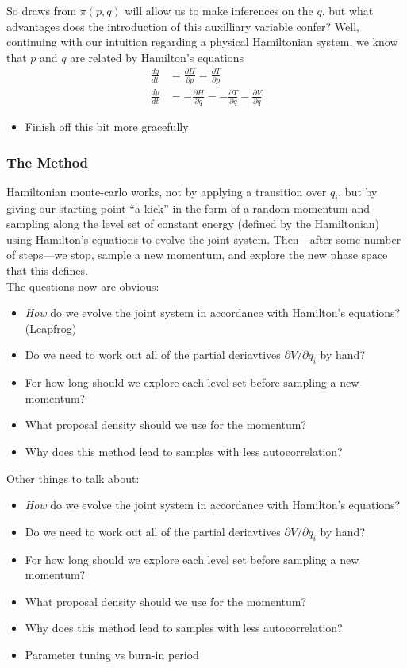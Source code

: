\documentclass{report}
\begin{document}
So draws from $\pi(p, q)$ will allow us to make inferences on the $q$, but what advantages does the introduction of this auxilliary variable confer? Well, continuing with our intuition regarding a physical Hamiltonian system, we know that $p$ and $q$ are related by Hamilton's equations
\begin{align}
\frac{dq}{dt} &= \frac{\partial H}{\partial p} = \frac{\partial T}{\partial p} \\
\frac{dp}{dt} &= - \frac{\partial H}{\partial q} = - \frac{\partial T}{\partial q} - \frac{\partial V}{\partial q}
\end{align}

\begin{itemize}
  \item Finish off this bit more gracefully
\end{itemize}

\subsubsection{The Method}
Hamiltonian monte-carlo works, not by applying a transition over $q_i$, but by giving our starting point ``a kick'' in the form of a random momentum and sampling along the level set of constant energy (defined by the Hamiltonian) using Hamilton's equations to evolve the joint system. Then---after some number of steps---we stop, sample a new momentum, and explore the new phase space that this defines. \\

The questions now are obvious:

\begin{itemize}
\item \emph{How} do we evolve the joint system in accordance with Hamilton's equations? (Leapfrog)
\item Do we need to work out all of the partial deriavtives $\partial V/\partial q_i$ by hand? 
\item For how long should we explore each level set before sampling a new momentum?
\item What proposal density should we use for the momentum?
\item Why does this method lead to samples with less autocorrelation?
\end{itemize}

Other things to talk about:
\begin{itemize}
\item \emph{How} do we evolve the joint system in accordance with Hamilton's equations?
\item Do we need to work out all of the partial deriavtives $\partial V/\partial q_i$ by hand? 
\item For how long should we explore each level set before sampling a new momentum?
\item What proposal density should we use for the momentum?
\item Why does this method lead to samples with less autocorrelation?
\item Parameter tuning vs burn-in period
\end{itemize}
\end{document}
